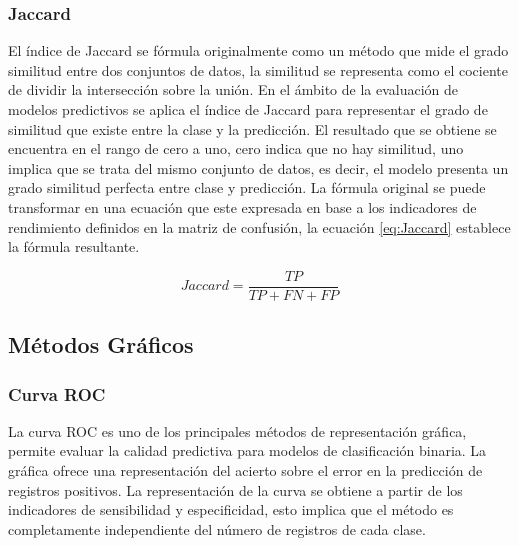 
\subsubsection{Jaccard}

El índice de Jaccard \cite{jaccard1912} se fórmula originalmente como un método que mide el grado similitud entre dos conjuntos de datos, la similitud se representa como el cociente de dividir la intersección sobre la unión. En el ámbito de la evaluación de modelos predictivos se aplica el índice de Jaccard para representar el grado de similitud que existe entre la clase y la predicción. El resultado que se obtiene se encuentra en el rango de cero a uno, cero indica que no hay similitud, uno implica que se trata del mismo conjunto de datos, es decir, el modelo presenta un grado similitud perfecta entre clase y predicción. La fórmula original se puede transformar en una ecuación que este expresada en base a los indicadores de rendimiento definidos en la matriz de confusión, la ecuación \ref{eq:Jaccard} establece la fórmula resultante.

\bigbreak

\begin{equation}
    Jaccard = \frac{TP}{TP+FN+FP}
    \label{eq:Jaccard}
\end{equation}

\clearpage

\subsection{Métodos Gráficos}

\subsubsection{Curva ROC}

La curva ROC \cite{ROC2006} es uno de los principales métodos de representación gráfica, permite evaluar la calidad predictiva para modelos de clasificación binaria. La gráfica ofrece una representación del acierto sobre el error en la predicción de registros positivos. La representación de la curva se obtiene a partir de los indicadores de sensibilidad y especificidad, esto implica que el método es completamente independiente del número de registros de cada clase.

\bigbreak

